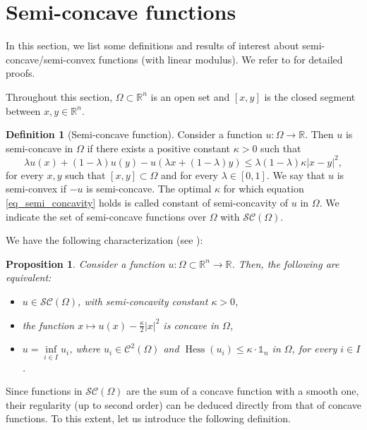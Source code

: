 \documentclass[reqno]{amsart}
\DeclareMathOperator{\Hess}{Hess}
\theoremstyle{plain}
\newtheorem{prop}[thm]{Proposition}
\theoremstyle{definition}
\newtheorem{Def}[thm]{Definition}
\theoremstyle{remark}
\begin{document}
\appendix
    
    \section{Semi-concave functions}\label{app:semiconcave}
    In this section, we list some definitions and results of interest about semi-concave/semi-convex functions (with linear modulus). We refer to \cite[Chapters 2 and 3]{CannarsaSinestrari} for detailed proofs.
    
	Throughout this section, $\Omega\subset\mathbb{R}^n$ is an open set and $[x,y]$ is the closed segment between $x,y\in\mathbb{R}^n$.
	\begin{Def}[Semi-concave function]\label{def_semi_concave}
		Consider a function $u:\Omega\to\mathbb{R}$. Then $u$ is semi-concave in $\Omega$ if there exists  
            a positive constant $\kappa>0$ such that 
            \begin{equation}\label{eq_semi_concavity}
			\lambda u(x)+(1-\lambda)u(y)-u(\lambda x+(1-\lambda)y)\leq\lambda(1-\lambda)\kappa|x-y|^2,
		\end{equation}
		for every $x,y$ such that $[x,y]\subset \Omega$ and for every $\lambda\in[0,1]$. We say that $u$ is semi-convex if $-u$ is semi-concave. The optimal $\kappa$ for which equation \eqref{eq_semi_concavity} holds is called constant of semi-concavity of $u$ in $\Omega$. 
		We indicate the set of semi-concave functions over $\Omega$ with $\mathcal{SC}(\Omega)$.
	\end{Def}
    We have the following characterization (see \cite[Proposition 1.1.3]{CannarsaSinestrari}):
    \begin{prop}\label{prop_charac_semi_concave_smooth}
        Consider a function $u:\Omega\subset\mathbb{R}^n\to\mathbb{R}$. Then, the following are equivalent:
        \begin{itemize}
            \item $u\in \mathcal{SC}(\Omega)$, with semi-concavity constant $\kappa>0$,
            \item the function $x\mapsto u(x)-\frac\kappa2|x|^2$ is concave in $\Omega$,
            \item $u=\inf\limits_{i\in I}u_i$, where $u_i\in\mathcal{C}^2(\Omega)$ and $\Hess(u_i)\leq\kappa\cdot\mathbb{1}_n$ in $\Omega$, for every $i\in I$.
        \end{itemize}
    \end{prop}
    Since functions in $\mathcal{SC}(\Omega)$ are the sum of a concave function with a smooth one, their regularity (up to second order) can be deduced directly from that of concave functions. To this extent, let us introduce the following definition.
\end{document}
